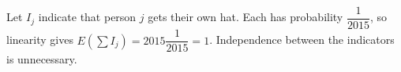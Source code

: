 Let $ I_j $ indicate that person $ j $ gets their own hat. Each has probability $\dfrac{1}{2015}$, so linearity gives $ E(\sum I_j)=2015\dfrac{1}{2015}=\boxed1 $. Independence between the indicators is unnecessary.

